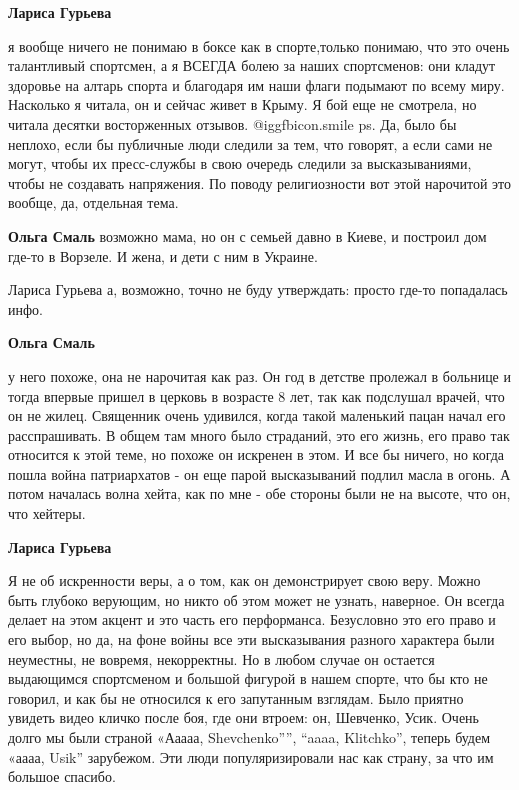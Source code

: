 \begin{itemize}
\begin{itemize} %
\textbf{Лариса Гурьева} 

я вообще ничего не понимаю в боксе как в спорте,только понимаю, что это очень
талантливый спортсмен, а я ВСЕГДА болею за наших спортсменов: они кладут
здоровье на алтарь спорта и благодаря им наши флаги подымают по всему миру.
Насколько я читала, он и сейчас живет в Крыму. Я бой еще не смотрела, но читала
десятки восторженных отзывов.  @igg{fbicon.smile}  ps. Да, было бы неплохо, если бы публичные
люди следили за тем, что говорят, а если сами не могут, чтобы их пресс-службы в
свою очередь следили за высказываниями, чтобы не создавать напряжения. По
поводу религиозности вот этой нарочитой это вообще, да, отдельная тема.


\textbf{Ольга Смаль} возможно мама, но он с семьей давно в Киеве, и построил дом где-то в Ворзеле. И жена, и дети с ним в Украине.

Лариса Гурьева а, возможно, точно не буду утверждать: просто где-то попадалась инфо.

\textbf{Ольга Смаль} 

у него похоже, она не нарочитая как раз. Он год в детстве пролежал в больнице и
тогда впервые пришел в церковь в возрасте 8 лет, так как подслушал врачей, что
он не жилец. Священник очень удивился, когда такой маленький пацан начал его
расспрашивать. В общем там много было страданий, это его жизнь, его право так
относится к этой теме, но похоже он искренен в этом. И все бы ничего, но когда
пошла война патриархатов - он еще парой высказываний подлил масла в огонь. А
потом началась волна хейта, как по мне - обе стороны были не на высоте, что он,
что хейтеры.

\textbf{Лариса Гурьева} 

Я не об искренности веры, а о том, как он демонстрирует свою веру. Можно быть
глубоко верующим, но никто об этом может не узнать, наверное. Он всегда делает
на этом акцент и это часть его перформанса. Безусловно это его право и его
выбор, но да, на фоне войны все эти высказывания разного характера были
неуместны, не вовремя, некорректны. Но в любом случае он остается выдающимся
спортсменом и большой фигурой в нашем спорте, что бы кто не говорил, и как бы
не относился к его запутанным взглядам. Было приятно увидеть видео кличко после
боя, где они втроем: он, Шевченко, Усик. Очень долго мы были страной «Ааааа,
Shevchenko””, “aaaa, Klitchko”, теперь будем «аааа, Usik” зарубежом. Эти люди
популяризировали нас как страну, за что им большое спасибо.


\end{itemize}
\end{itemize}
